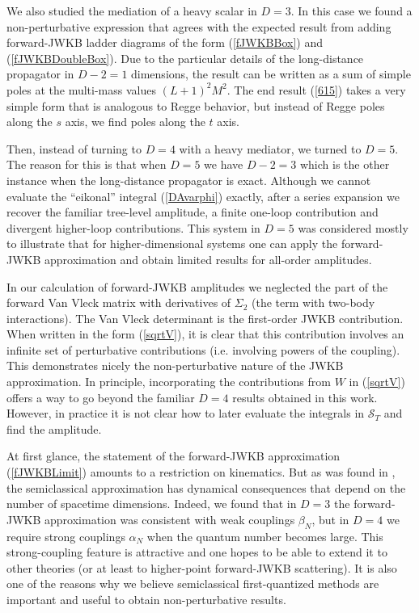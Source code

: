 We also studied the mediation of a heavy scalar in $D = 3$. In this case we found a non-perturbative expression that agrees with the expected result from adding forward-JWKB ladder diagrams of the form (\ref{fJWKBBox}) and (\ref{fJWKBDoubleBox}). Due to the particular details of the long-distance propagator in $D - 2 = 1$ dimensions, the result can be written as a sum of simple poles at the multi-mass values $(L+1)^{2}M^{2}$. The end result (\ref{615}) takes a very simple form that is analogous to Regge behavior, but instead of Regge poles along the $s$ axis, we find poles along the $t$ axis.

Then, instead of turning to $D = 4$ with a heavy mediator, we turned to $D = 5$. The reason for this is that when $D = 5$ we have $D - 2 = 3$ which is the other instance when the long-distance propagator is exact. Although we cannot evaluate the ``eikonal'' integral (\ref{DAvarphi}) exactly, after a series expansion we recover the familiar tree-level amplitude, a finite one-loop contribution and divergent higher-loop contributions. This system in $D = 5$ was considered mostly to illustrate that for higher-dimensional systems one can apply the forward-JWKB approximation and obtain limited results for all-order amplitudes.

In our calculation of forward-JWKB amplitudes we neglected the part of the forward Van Vleck matrix with derivatives of $\Sigma_{2}$ (the term with two-body interactions). The Van Vleck determinant is the first-order JWKB contribution. When written in the form (\ref{sqrtV}), it is clear that this contribution involves an infinite set of perturbative contributions (i.e. involving powers of the coupling). This demonstrates nicely the non-perturbative nature of the JWKB approximation. In principle, incorporating the contributions from $W$ in (\ref{sqrtV}) offers a way to go beyond the familiar $D = 4$ results obtained in this work. However, in practice it is not clear how to later evaluate the integrals in $\mathcal{S}_{T}$ and find the amplitude.

At first glance, the statement of the forward-JWKB approximation (\ref{fJWKBLimit}) amounts to a restriction on kinematics. But as was found in \cite{HalpernSiegel}, the semiclassical approximation has dynamical consequences that depend on the number of spacetime dimensions. Indeed, we found that in $D = 3$ the forward-JWKB approximation was consistent with weak couplings $\beta_{N}$, but in $D = 4$ we require strong couplings $\alpha_{N}$ when the quantum number becomes large. This strong-coupling feature is attractive and one hopes to be able to extend it to other theories (or at least to higher-point forward-JWKB scattering). It is also one of the reasons why we believe semiclassical first-quantized methods are important and useful to obtain non-perturbative results.
